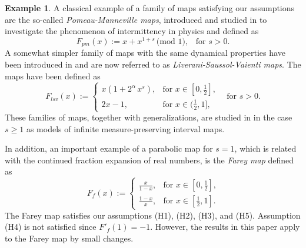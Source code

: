 \documentclass{amsart}
\theoremstyle{definition}
\theoremstyle{remark}
\theoremstyle{definition}
\newtheorem{example}[theorem]{Example}
\numberwithin{equation}{section}
\begin{document}
\begin{example} \label{examples}
A classical example of a family of maps satisfying our assumptions are the so-called \emph{Pomeau-Manneville maps}, introduced and studied in \cite{M,PM} to investigate the phenomenon of intermittency in physics and defined as
\[
F_{pm}(x) := x + x^{1+s} \, \text{(mod $1$),} \quad \text{for $s>0$.}
\]
A somewhat simpler family of maps with the same dynamical properties have been introduced in \cite{LSV} and are now referred to as \emph{Liverani-Saussol-Vaienti maps}. The maps have been defined as
\[
F_{lsv}(x):=\begin{cases}
x(1+2^\alpha\, x^{s}), & \text{for $x\in [0, \frac 12]$,}\\[0.1cm]
2x-1, & \text{for $x\in (\frac 12, 1]$},
\end{cases} \quad \text{for $s>0$.}
\]
These families of maps, together with generalizations, are studied in \cite{BL} in the case $s\ge 1$ as models of infinite measure-preserving interval maps.

In addition, an important example of a parabolic map for $s=1$, which is related with the continued fraction expansion of real numbers, is the \emph{Farey map} defined as
\[
F_f(x) := \begin{cases}
        \frac{x}{1-x}, & \text{for $x\in [0, \frac 12]$,}\\[0.1cm]
        \frac{1-x}{x}, & \text{for $x\in [\frac 12, 1]$}.
    \end{cases}
\]
The Farey map satisfies our assumptions (H1), (H2), (H3), and (H5). Assumption (H4) is not satisfied since $F'_f(1)=-1$. However, the results in this paper apply to the Farey map by small changes.
\end{example}
\end{document}
